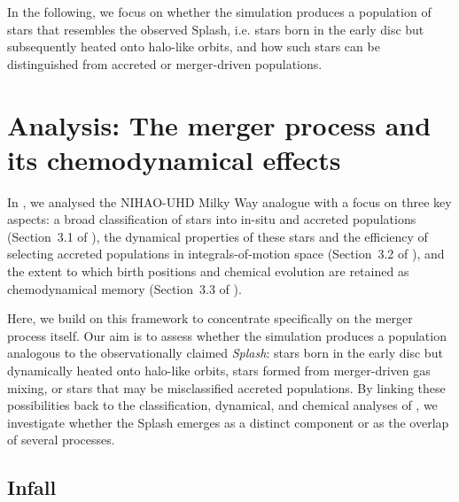 \documentclass[fleqn,usenatbib]{mnras}
\begin{document}
In the following, we focus on whether the simulation produces a population of stars that resembles the observed Splash, i.e. stars born in the early disc but subsequently heated onto halo-like orbits, and how such stars can be distinguished from accreted or merger-driven populations.

\section{Analysis: The merger process and its chemodynamical effects} \label{sec:analysis}

In , we analysed the NIHAO-UHD Milky Way analogue with a focus on three key aspects: a broad classification of stars into in-situ and accreted populations (Section~3.1 of ), the dynamical properties of these stars and the efficiency of selecting accreted populations in integrals-of-motion space (Section~3.2 of ), and the extent to which birth positions and chemical evolution are retained as chemodynamical memory (Section~3.3 of ). 

Here, we build on this framework to concentrate specifically on the merger process itself. Our aim is to assess whether the simulation produces a population analogous to the observationally claimed \textit{Splash}: stars born in the early disc but dynamically heated onto halo-like orbits, stars formed from merger-driven gas mixing, or stars that may be misclassified accreted populations. By linking these possibilities back to the classification, dynamical, and chemical analyses of , we investigate whether the Splash emerges as a distinct component or as the overlap of several processes.

\subsection{Infall}
\end{document}
